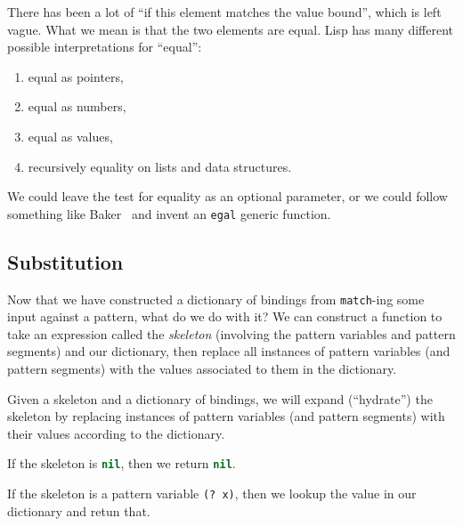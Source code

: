 There has been a lot of ``if this element matches the value bound'',
which is left vague. What we mean is that the two elements are equal.
Lisp has many different possible interpretations for ``equal'':
\begin{enumerate}
\item equal as pointers,
\item equal as numbers,
\item equal as values,
\item recursively equality on lists and data structures.
\end{enumerate}
We could leave the test for equality as an optional parameter, or we
could follow something like Baker~\cite{baker1993equal} and invent an
\lstinline[language=lisp]{egal} generic function.

\subsection{Substitution}

\M
Now that we have constructed a dictionary of bindings from
\lstinline[language=lisp]{match}-ing some input against a
pattern, what do we do with it? We can construct a function to take an
expression called the \emph{skeleton} (involving the pattern variables
and pattern segments) and our dictionary, then replace all instances of
pattern variables (and pattern segments) with the values associated to
them in the dictionary.

Given a skeleton and a dictionary of bindings, we will expand
(``hydrate'') the skeleton by replacing instances of pattern variables
(and pattern segments) with their values according to the dictionary.

 If the skeleton is \lstinline[language=lisp]{nil},
then we return \lstinline[language=lisp]{nil}.

 If the skeleton is a pattern variable
\lstinline[language=lisp]{(? x)}, then we lookup the value in our
dictionary and retun that.

